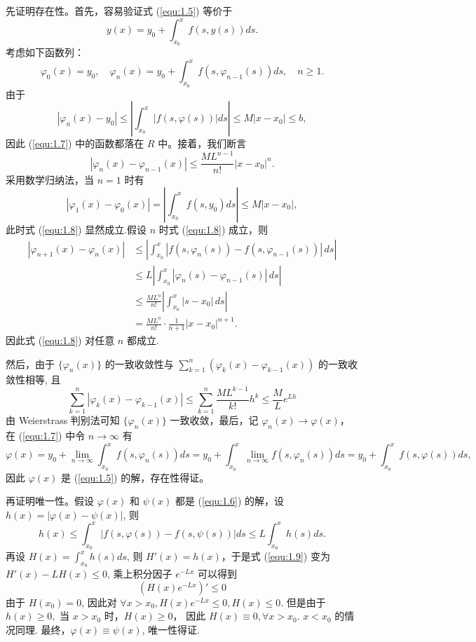 \begin{pf1}
先证明存在性。首先，容易验证式 (\ref{equ:1.5}) 等价于
\begin{equation}\label{equ:1.6}
y(x)=y_0+\int_{x_0}^xf(s,y(s))ds.
\end{equation}
考虑如下函数列：
\begin{equation}\label{equ:1.7}
\varphi_0(x)=y_0,\quad \varphi_n(x)=y_0+\int_{x_0}^xf(s,\varphi_{n-1}(s))ds,\quad n\geq 1. 
\end{equation}
由于
\[
|\varphi_n(x)-y_0|\leq\left|\int_{x_0}^{x}|f(s,\varphi(s))|ds \right|\leq M|x-x_0|\leq b,
\]
因此 (\ref{equ:1.7}) 中的函数都落在 $R$ 中。接着，我们断言
\begin{equation}\label{equ:1.8}
|\varphi_n(x)-\varphi_{n-1}(x)|\leq\frac{ML^{n-1}}{n!}|x-x_0|^n.
\end{equation}
采用数学归纳法，当 $n=1$ 时有
\[
|\varphi_1(x)-\varphi_0(x)|=\left|\int_{x_0}^xf(s,y_0)ds\right|\leq M|x-x_0|,
\]
此时式 (\ref{equ:1.8}) 显然成立.假设 $n$ 时式 (\ref{equ:1.8}) 成立，则
\begin{align*}
|\varphi_{n+1}(x)-\varphi_n(x)|
  &\le \left|\int_{x_0}^x |f(s,\varphi_n(s))-f(s,\varphi_{n-1}(s))|\,ds\right|\\
  &\le L\left|\int_{x_0}^x |\varphi_n(s)-\varphi_{n-1}(s)|\,ds\right|\\
  &\le \frac{ML^n}{n!}\left|\int_{x_0}^x |s-x_0|\,ds\right|\\
  &= \frac{ML^n}{n!}\cdot\frac{1}{n+1}|x-x_0|^{n+1}.
\end{align*}
因此式 (\ref{equ:1.8}) 对任意 $n$ 都成立.

然后，由于 $\{\varphi_n(x)\}$ 的一致收敛性与 $\sum_{k=1}^{n}\left(\varphi_k(x)-\varphi_{k-1}(x)\right)$ 的一致收敛性相等,
且
\[
\sum_{k=1}^n\left| \varphi_k(x)-\varphi_{k-1}(x) \right|\leq \sum_{k=1}^{n}\frac{ML^{k-1}}{k!}h^k\leq \frac{M}{L}e^{Lh}
\]
由 Weierstrass 判别法可知 $\{\varphi_n(x)\}$ 一致收敛，最后，记 $\varphi_n(x)\to \varphi(x)$，在 (\ref{equ:1.7}) 中令 $n\to\infty$ 有
\[
\varphi(x)=y_0+\lim_{n\to\infty}\int_{x_0}^{x}f(s,\varphi_n(s))ds=y_0+\int_{x_0}^{x}\lim_{n\to\infty}f(s,\varphi_n(s))ds=y_0+\int_{x_0}^{x}f(s,\varphi(s))ds,
\]
因此 $\varphi(x)$ 是 (\ref{equ:1.5}) 的解，存在性得证。

再证明唯一性。假设 $\varphi(x)$ 和 $\psi(x)$ 都是 (\ref{equ:1.6}) 的解，设 $h(x)=|\varphi(x)-\psi(x)|$,
则
\begin{equation}\label{equ:1.9}
h(x)\leq\int_{x_0}^x|f(s,\varphi(s))-f(s,\psi(s))|ds\leq L\int_{x_0}^xh(s)ds.
\end{equation}
再设 $H(x)=\int_{x_0}^xh(s)ds$, 则 $H'(x)=h(x)$，于是式 (\ref{equ:1.9}) 变为 $H'(x)-LH(x)\leq 0$, 乘上积分因子 $e^{-Lx}$ 可以得到
\[
(H(x)e^{-Lx})'\leq0
\]
由于 $H(x_0)=0$, 因此对 $\forall x>x_0, H(x)e^{-Lx}\leq0, H(x)\leq 0$. 但是由于 $h(x)\geq0,$ 当 $x>x_0$ 时，$H(x)\geq0$，
因此 $H(x)\equiv 0,\forall x>x_0$. $x<x_0$ 的情况同理. 最终，$\varphi(x)\equiv\psi(x)$, 唯一性得证.
\end{pf1}

